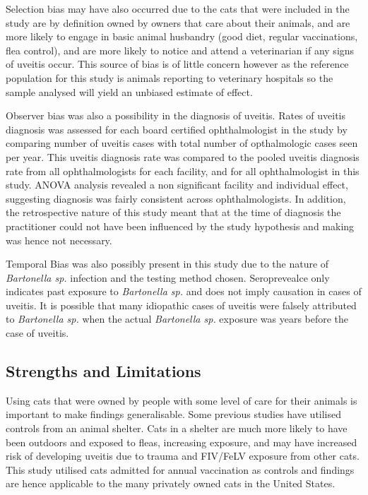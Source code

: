 \documentclass[11pt,twocolumn]{article}
\begin{document}
		Selection bias may have also occurred due to the cats that were included in the study are by definition owned by owners that care about their animals, and are more likely to engage in basic animal husbandry (good diet, regular vaccinations, flea control), and are more likely to notice and attend a veterinarian if any signs of uveitis occur.  
		This source of bias is of little concern however as the reference population for this study is animals reporting to veterinary hospitals so the sample analysed will yield an unbiased estimate of effect.


		Observer bias was also a possibility in the diagnosis of uveitis.
		Rates of uveitis diagnosis was assessed for each board certified ophthalmologist in the study by comparing number of uveitis cases with total number of opthalmologic cases seen per year. This uveitis diagnosis rate was compared to the pooled uveitis diagnosis rate from all ophthalmologists for each facility, and for all ophthalmologist in this study.
		ANOVA analysis revealed a non significant facility and individual effect, suggesting diagnosis was fairly consistent across ophthalmologists.
		In addition, the retrospective nature of this study meant that at the time of diagnosis the practitioner could not have been influenced by the study hypothesis and making was hence not necessary. 


		Temporal Bias was also possibly present in this study due to the nature of \emph{Bartonella sp.} infection and the testing method chosen. 
		Seroprevealce only indicates past exposure to \emph{Bartonella sp.} and does not imply causation in cases of uveitis.
		It is possible that many idiopathic cases of uveitis were falsely attributed to \emph{Bartonella sp.} when the actual \emph{Bartonella sp.} exposure was years before the case of uveitis.


	\subsection{Strengths and Limitations}
		Using cats that were owned by people with  some level of care for their animals is important to make findings generalisable.
		Some previous studies have utilised controls from an animal shelter. Cats in a shelter are much more likely to have been outdoors and exposed to fleas, increasing exposure, and may have increased risk of developing uveitis due to trauma and FIV/FeLV exposure from other cats.
		This study utilised cats admitted for annual vaccination as controls and findings are hence applicable to the many privately owned cats in the United States.
\end{document}
